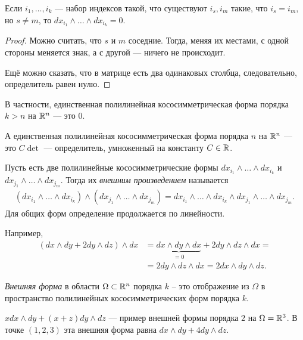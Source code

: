 \begin{remrk}
 Если $i_1, \ldots, i_k$ --- набор индексов такой, что существуют $i_s, i_m$ такие, что $i_s = i_m$, но $s \neq m$, то $dx_{i_1} \land \ldots \land dx_{i_k} = 0$.
\end{remrk}
\begin{proof}
 Можно считать, что $s$ и $m$ соседние. Тогда, меняя их местами, с одной стороны меняется знак, а с другой --- ничего не происходит.

 Ещё можно сказать, что в матрице есть два одинаковых столбца, следовательно, определитель равен нулю.
\end{proof}
\begin{crly}
 В частности, единственная полилинейная кососимметрическая форма порядка $k > n$ на $\mathbb{R}^{n}$ --- это $0$.

 А единственная полилинейная кососимметрическая форма порядка $n$ на $\mathbb{R}^{n}$ --- это $C \det$ --- определитель, умноженный на константу $C \in \mathbb{R}$.
\end{crly}
\begin{df}
Пусть есть две полилинейные кососимметрические формы $dx_{i_1} \land \ldots \land dx_{i_k}$  и $dx_{j_1} \land \ldots \land dx_{j_m}$. Тогда их \textit{внешним произведением} называется
 \begin{align*}
  (dx_{i_1} \land \ldots \land dx_{i_k}) \land (dx_{j_1} \land \ldots \land dx_{j_m}) = dx_{i_1} \land \ldots \land dx_{i_k} \land dx_{j_1} \land \ldots \land dx_{j_m}
 .\end{align*} Для общих форм определение продолжается по линейности.

 Например,
 \begin{align*}
	 (dx \land dy + 2dy \land dz) \land dx &= \underbrace{dx \land dy \land dx}_{=0} + 2 dy \land dz \land dx = \\
  &= 2 dy \land dz \land dx = 2 dx \land dy \land dz
 .\end{align*} 
\end{df}

\begin{df}
 \textit{Внешняя форма} в области $\Omega \subset \mathbb{R}^{n}$ порядка $k$ -- это отображение из $\Omega$ в пространство полилинейных кососимметрических форм порядка $k$.
\end{df}
\begin{exmpl}
 $x dx \land dy + (x + z) dy \land dz$ --- пример внешней формы порядка $2$ на $\Omega = \mathbb{R}^{3}$. В точке $(1,2,3)$ эта внешняя форма равна $ dx \land dy + 4 dy \land dz $.
\end{exmpl}

